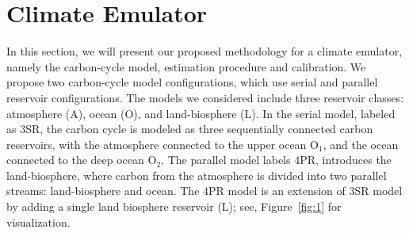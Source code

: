 \documentclass[11pt, a4paper, pdftex, twoside, dvipsnames]{article}
\renewcommand{\ref}{\cref}
\begin{document}
\section{Climate Emulator}\label{sec:clim_model}
In this section, we will present our proposed methodology for a climate emulator, namely the carbon-cycle model, estimation procedure and calibration. 
%
We propose two carbon-cycle model configurations, which use serial and parallel reservoir configurations. 
The models we considered include three reservoir classes: atmosphere ($\text{A}$), ocean ($\text{O}$), and land-biosphere ($\text{L}$).
%
In the serial model, labeled as $3$SR, the carbon cycle is modeled as three sequentially connected carbon reservoirs, with the atmosphere connected to the upper ocean $\text{O}_1$, and the ocean connected to the deep ocean $\text{O}_2$. 
%
The parallel model labels  $4$PR,  introduces the land-biosphere, where carbon from the atmosphere is divided into two parallel streams: land-biosphere and ocean. 
%
The $4$PR model is an extension of $3$SR model by adding a single land biosphere reservoir ($\text{L}$); see, Figure~\ref{fig:1} for visualization.

\end{document}
